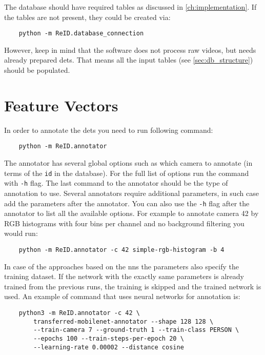 The database should have required tables as discussed in \autoref{ch:implementation}. If the tables are not present, they could be created via:

\begin{verbatim}
    python -m ReID.database_connection
\end{verbatim}

However, keep in mind that the software does not process raw videos, but needs already prepared \glspl{det}. That means all the input tables (see \autoref{sec:db_structure}) should be populated.

\section{Feature Vectors}

In order to annotate the \glspl{det} you need to run following command:

\begin{verbatim}
    python -m ReID.annotator
\end{verbatim}

The annotator has several global options such as which camera to annotate (in terms of the \verb+id+ in the database). For the full list of options run the command with \verb+-h+ flag. The last command to the annotator should be the type of annotation to use. Several annotators require additional parameters, in such case add the parameters after the annotator. You can also use the \verb+-h+ flag after the annotator to list all the available options. For example to annotate camera 42 by RGB histograms with four bins per channel and no background filtering you would run:

\begin{verbatim}
    python -m ReID.annotator -c 42 simple-rgb-histogram -b 4
\end{verbatim}

In case of the approaches based on the \glspl{nn} the parameters also specify the training dataset. If the network with the exactly same parameters is already trained from the previous runs, the training is skipped and the trained network is used. An example of command that uses neural networks for annotation is:

\begin{verbatim}
    python3 -m ReID.annotator -c 42 \
        transferred-mobilenet-annotator --shape 128 128 \
        --train-camera 7 --ground-truth 1 --train-class PERSON \
        --epochs 100 --train-steps-per-epoch 20 \
        --learning-rate 0.00002 --distance cosine
\end{verbatim}

